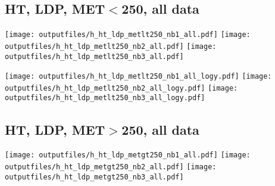 \documentclass[11pt]{article}
\begin{document}





    \subsection{ HT, LDP, MET$<$250, all data}

    \noindent
     \texttt{[image: outputfiles/h\_ht\_ldp\_metlt250\_nb1\_all.pdf]}
     \texttt{[image: outputfiles/h\_ht\_ldp\_metlt250\_nb2\_all.pdf]}
     \texttt{[image: outputfiles/h\_ht\_ldp\_metlt250\_nb3\_all.pdf]}

    \noindent
     \texttt{[image: outputfiles/h\_ht\_ldp\_metlt250\_nb1\_all\_logy.pdf]}
     \texttt{[image: outputfiles/h\_ht\_ldp\_metlt250\_nb2\_all\_logy.pdf]}
     \texttt{[image: outputfiles/h\_ht\_ldp\_metlt250\_nb3\_all\_logy.pdf]}


    \subsection{ HT, LDP, MET$>$250, all data}

    \noindent
     \texttt{[image: outputfiles/h\_ht\_ldp\_metgt250\_nb1\_all.pdf]}
     \texttt{[image: outputfiles/h\_ht\_ldp\_metgt250\_nb2\_all.pdf]}
     \texttt{[image: outputfiles/h\_ht\_ldp\_metgt250\_nb3\_all.pdf]}
\end{document}
